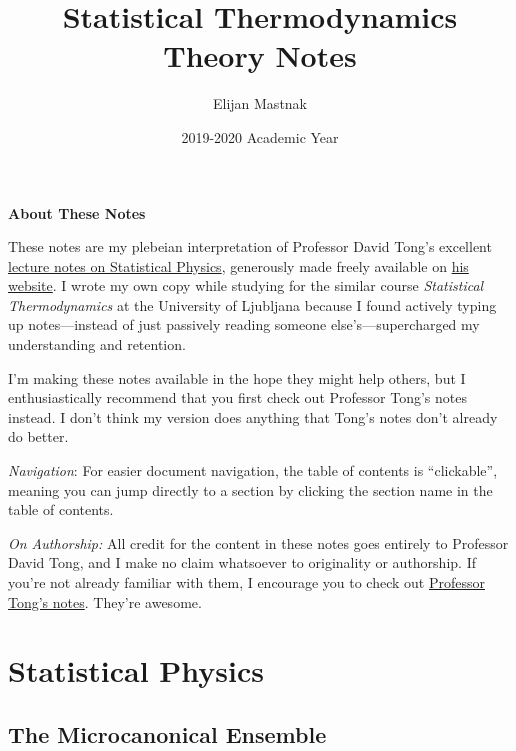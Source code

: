 \documentclass[11pt, a4paper]{article}
\begin{document}
\title{Statistical Thermodynamics Theory Notes}
\author{Elijan Mastnak}
\date{2019-2020 Academic Year}
\maketitle

\begin{center}
\textbf{About These Notes}
\end{center}
These notes are my plebeian interpretation of Professor David Tong's excellent \href{http://www.damtp.cam.ac.uk/user/tong/statphys.html}{lecture notes on Statistical Physics}, generously made freely available on \href{http://www.damtp.cam.ac.uk/user/tong/teaching.html}{his website}. I wrote my own copy while studying for the similar course \textit{Statistical Thermodynamics} at the University of Ljubljana because I found actively typing up notes---instead of just passively reading someone else's---supercharged my understanding and retention. 

I'm making these notes available in the hope they might help others, but I enthusiastically recommend that you first check out Professor Tong's notes instead. I don't think my version does anything that Tong's notes don't already do better.

\vspace{2mm}
\textit{Navigation}: For easier document navigation, the table of contents is ``clickable'', meaning you can jump directly to a section by clicking the section name in the table of contents.

\vspace{2mm}
\textit{On Authorship:} All credit for the content in these notes goes entirely to Professor David Tong, and I make no claim whatsoever to originality or authorship. If you're not already familiar with them, I encourage you to check out \href{http://www.damtp.cam.ac.uk/user/tong/teaching.html}{Professor Tong's notes}. They're awesome.


\tableofcontents

\newpage

\section{Statistical Physics}

\subsection{The Microcanonical Ensemble}
\end{document}
